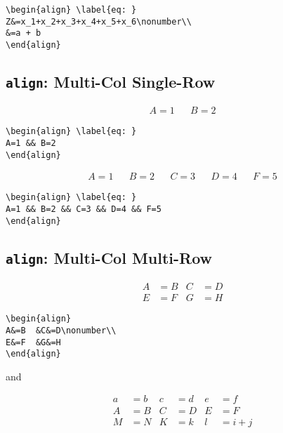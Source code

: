 \documentclass[journal]{IEEEtran}
\begin{document}
\begin{verbatim}
\begin{align} \label{eq: }
Z&=x_1+x_2+x_3+x_4+x_5+x_6\nonumber\\
&=a + b
\end{align}
\end{verbatim}


\subsection{\texttt{align}: Multi-Col Single-Row}

\begin{align}
A=1 && B=2
\end{align}

\begin{verbatim}
\begin{align} \label{eq: }
A=1 && B=2
\end{align}
\end{verbatim}

\begin{align}
A=1 && B=2 && C=3 && D=4 && F=5
\end{align}

\begin{verbatim}
\begin{align} \label{eq: }
A=1 && B=2 && C=3 && D=4 && F=5
\end{align}
\end{verbatim}


\subsection{\texttt{align}: Multi-Col Multi-Row}

\begin{align}
A&=B  &C&=D\nonumber\\
E&=F  &G&=H
\end{align}

\begin{verbatim}
\begin{align}
A&=B  &C&=D\nonumber\\
E&=F  &G&=H
\end{align}
\end{verbatim}

and

\begin{align}
a&=b &  c&=d &  e&=f \nonumber\\
A&=B &  C&=D &  E&=F \nonumber\\
M&=N &  K&=k &  l&=i+j
\end{align}
\end{document}
